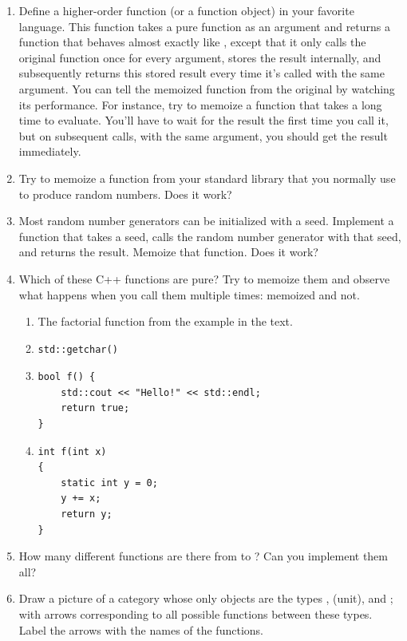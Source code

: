 \begin{enumerate}
\tightlist
\item
  Define a higher-order function (or a function object) 
  in your favorite language. This function takes a pure function
   as an argument and returns a function that behaves almost
  exactly like , except that it only calls the original
  function once for every argument, stores the result internally, and
  subsequently returns this stored result every time it's called with
  the same argument. You can tell the memoized function from the
  original by watching its performance. For instance, try to memoize a
  function that takes a long time to evaluate. You'll have to wait for
  the result the first time you call it, but on subsequent calls, with
  the same argument, you should get the result immediately.
\item
  Try to memoize a function from your standard library that you normally
  use to produce random numbers. Does it work?
\item
  Most random number generators can be initialized with a seed.
  Implement a function that takes a seed, calls the random number
  generator with that seed, and returns the result. Memoize that
  function. Does it work?
\item
  Which of these C++ functions are pure? Try to memoize them and observe
  what happens when you call them multiple times: memoized and not.

  \begin{enumerate}
  \tightlist
  \item
    The factorial function from the example in the text.
  \item
\begin{verbatim}
std::getchar()
\end{verbatim}
  \item
\begin{verbatim}
bool f() { 
    std::cout << "Hello!" << std::endl;
    return true;
}
\end{verbatim}
  \item
\begin{verbatim}
int f(int x)
{
    static int y = 0;
    y += x;
    return y;
}
\end{verbatim}
  \end{enumerate}
\item
  How many different functions are there from  to
  ? Can you implement them all?
\item
  Draw a picture of a category whose only objects are the types
  , \code{()} (unit), and ; with arrows
  corresponding to all possible functions between these types. Label the
  arrows with the names of the functions.
\end{enumerate}